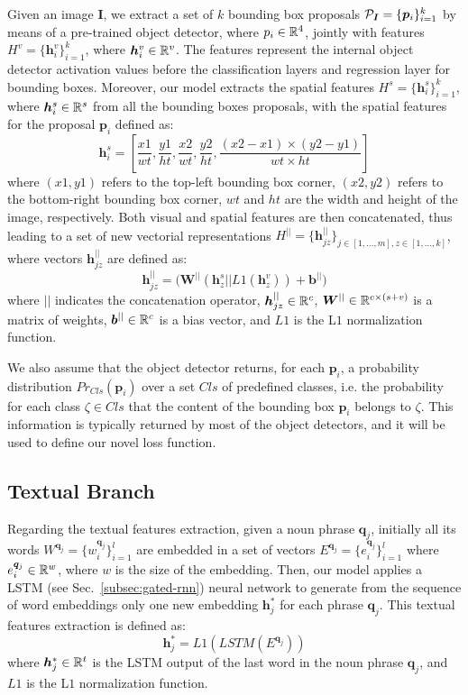 Given an image $\bm{I}$, we extract a set of $k$ bounding box
proposals $\mathcal{P}_{\bm{I}} = \{ \bm{p}_i \}^k_{i=1}$ by means of a
pre-trained object detector, where $p_i \in \mathbb{R}^4$, jointly with
features $H^v = \{ \bm{h}^v_i \}^k_{i=1}$, where $\bm{h}^v_i \in
\mathbb{R}^v$. The features represent the internal object detector
activation values before the classification layers and regression
layer for bounding boxes. Moreover, our model extracts the spatial
features $H^s = \{ \bm{h}^s_i \}^k_{i=1}$, where $\bm{h}^s_i \in
\mathbb{R}^s$ from all the bounding boxes proposals, with the spatial
features for the proposal $\bm{p}_i$ defined as:
\begin{equation}
  \bm{h}^s_i = \left[ \frac{x1}{wt}, \frac{y1}{ht}, \frac{x2}{wt}, \frac{y2}{ht}, \frac{(x2 - x1) \times (y2 - y1)}{wt \times ht}  \right]
\end{equation}
where $(x1, y1)$ refers to the top-left bounding box corner, $(x2,
y2)$ refers to the bottom-right bounding box corner, $wt$ and $ht$ are
the width and height of the image, respectively. Both visual and
spatial features are then concatenated, thus leading to a set of new
vectorial representations $H^{||} = \{ \bm{h}^{||}_{jz} \}_{j \in [1,
\ldots, m], z \in [1, \ldots, k]}$, where vectors $\bm{h}^{||}_{jz}$
are defined as:
\begin{equation}
  \bm{h}^{||}_{jz} = \Big( \bm{W}^{||} \left( \bm{h}^s_z || L1(\bm{h}^v_z) \right) + \bm{b}^{||} \Big) 
\end{equation}
where $||$ indicates the concatenation operator, $\bm{h}^{||}_{jz} \in
\mathbb{R}^c$, $\bm{W}^{||} \in \mathbb{R}^{c \times (s + v)}$ is a matrix
of weights, $\bm{b}^{||} \in \mathbb{R}^c$ is a bias vector, and $L1$ is
the L$1$ normalization function.

We also assume that the object detector returns, for each $\bm{p}_i$,
a probability distribution $Pr_{Cls}(\bm{p}_i)$ over a set $Cls$ of
predefined classes, i.e. the probability for each class $\zeta \in
Cls$ that the content of the bounding box $\bm{p}_i$ belongs to
$\zeta$. This information is typically returned by most of the object
detectors, and it will be used to define our novel loss function.

\subsection{Textual Branch}

Regarding the textual features extraction, given a noun phrase
$\bm{q}_j$, initially all its words $W^{\bm{q}_j} = \{ w^{\bm{q}_j}_i
\}^l_{i=1}$ are embedded in a set of vectors $E^{\bm{q}_j} =
\{e^{\bm{q}_j}_i \}^l_{i=1}$ where $e^{\bm{q}_j}_i \in \mathbb{R}^w$, where
$w$ is the size of the embedding. Then, our model applies a LSTM (see
Sec.~\ref{subsec:gated-rnn}) neural network to generate from the
sequence of word embeddings only one new embedding $\bm{h}^*_j$ for
each phrase $\bm{q}_j$. This textual features extraction is defined
as:
\begin{equation}
  \bm{h}^*_j = L1(LSTM(E^{\bm{q}_j}))
\end{equation}
where $\bm{h}^*_j \in \mathbb{R}^t$ is the LSTM output of the last word in
the noun phrase $\bm{q}_j$, and $L1$ is the L$1$ normalization
function.

